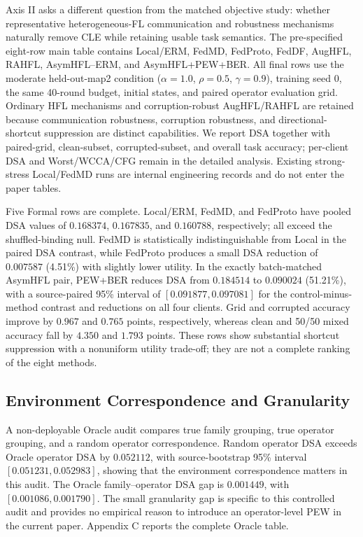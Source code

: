 Axis II asks a different question from the matched objective study: whether representative heterogeneous-FL communication and robustness mechanisms naturally remove CLE while retaining usable task semantics. The pre-specified eight-row main table contains Local/ERM, FedMD, FedProto, FedDF, AugHFL, RAHFL, AsymHFL--ERM, and AsymHFL+PEW+BER. All final rows use the moderate held-out-map2 condition ($\alpha=1.0$, $\rho=0.5$, $\gamma=0.9$), training seed 0, the same 40-round budget, initial states, and paired operator evaluation grid. Ordinary HFL mechanisms and corruption-robust AugHFL/RAHFL are retained because communication robustness, corruption robustness, and directional-shortcut suppression are distinct capabilities. We report DSA together with paired-grid, clean-subset, corrupted-subset, and overall task accuracy; per-client DSA and Worst/WCCA/CFG remain in the detailed analysis. Existing strong-stress Local/FedMD runs are internal engineering records and do not enter the paper tables.



Five Formal rows are complete. Local/ERM, FedMD, and FedProto have pooled DSA values of \(0.168374\), \(0.167835\), and \(0.160788\), respectively; all exceed the shuffled-binding null. FedMD is statistically indistinguishable from Local in the paired DSA contrast, while FedProto produces a small DSA reduction of \(0.007587\) (4.51\%) with slightly lower utility. In the exactly batch-matched AsymHFL pair, PEW+BER reduces DSA from \(0.184514\) to \(0.090024\) (51.21\%), with a source-paired 95\% interval of \([0.091877,0.097081]\) for the control-minus-method contrast and reductions on all four clients. Grid and corrupted accuracy improve by \(0.967\) and \(0.765\) points, respectively, whereas clean and 50/50 mixed accuracy fall by \(4.350\) and \(1.793\) points. These rows show substantial shortcut suppression with a nonuniform utility trade-off; they are not a complete ranking of the eight methods.


\subsection{Environment Correspondence and Granularity}

A non-deployable Oracle audit compares true family grouping, true operator grouping, and a random operator correspondence. Random operator DSA exceeds Oracle operator DSA by \(0.052112\), with source-bootstrap 95\% interval \([0.051231,0.052983]\), showing that the environment correspondence matters in this audit. The Oracle family--operator DSA gap is \(0.001449\), with \([0.001086,0.001790]\). The small granularity gap is specific to this controlled audit and provides no empirical reason to introduce an operator-level PEW in the current paper. Appendix C reports the complete Oracle table.

